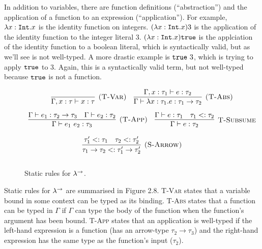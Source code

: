 In addition to variables, there are function definitions (``abstraction'') and the application of a function to an expression (``application''). For example, $\lambda x: \mathtt{Int} . x$ is the identity function on integers. $(\lambda x: \mathtt{Int} . x) 3$ is the application of the identity function to the integer literal $3$. $(\lambda x: \mathtt{Int} . x) \mathtt{true}$ is the applciation of the identity function to a boolean literal, which is syntactically valid, but as we'll see is not well-typed. A more drastic example is $\mathtt{true}~3$, which is trying to apply $\mathtt{true}$ to $3$. Again, this is a syntactically valid term, but not well-typed because $\mathtt{true}$ is not a function.\\





\begin{figure}[h]


\[
\begin{array}{c}


\infer[\textsc{(T-Var)}]
	{\Gamma, x: \tau \vdash x: \tau}
	{}
	
~~~
	
\infer[\textsc{(T-Abs)}]
	{\Gamma \vdash \lambda x: \tau_1.e : \tau_1 \rightarrow \tau_2}
	{\Gamma, x: \tau_1 \vdash e: \tau_2} \\[2ex]
	
	
\infer[\textsc{(T-App)}]
	{\Gamma \vdash e_1~e_2: \tau_3}
	{\Gamma \vdash e_1: \tau_2 \rightarrow \tau_3 & \Gamma \vdash e_2: \tau_2}
	~~~
\infer[\textsc{T-Subsume}]
	{\Gamma \vdash e: \tau_2}
	{\Gamma \vdash e: \tau_1 & \tau_1 <: \tau_2 }

\end{array}
\]

	
\fbox{$\tau <: \tau$}

	
\[
\begin{array}{c}


\infer[\textsc{(S-Arrow)}]
	{\tau_1 \rightarrow \tau_2 <: \tau_1' \rightarrow \tau_2'}
	{\tau_1' <: \tau_1 & \tau_2 <: \tau_2'}\\[2ex]


\end{array}
\]

\vspace{-12pt}
\caption{Static rules for $\lambda^{\rightarrow}$.}
\label{This is the label.}
\end{figure}

Static rules for $\lambda^{\rightarrow}$ are summarised in Figure 2.8. \textsc{T-Var} states that a variable bound in some context can be typed as its binding. \textsc{T-Abs} states that a function can be typed in $\Gamma$ if $\Gamma$ can type the body of the function when the function's argument has been bound. \textsc{T-App} states that an application is well-typed if the left-hand expression is a function (has an arrow-type $\tau_2 \rightarrow \tau_3$) and the right-hand expression has the same type as the function's input ($\tau_2$).

